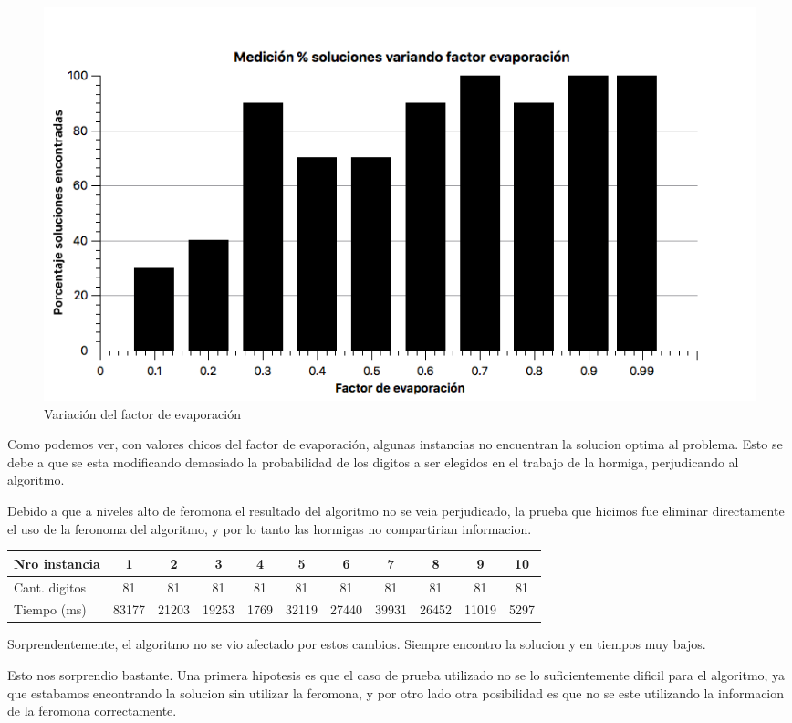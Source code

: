 \begin{figure}[h]
	\centering
	\includegraphics[scale=0.4]{./graficos/variacion_evaporacion.png}
	\caption{Variación del factor de evaporación}
\end{figure}

\newpage

Como podemos ver, con valores chicos del factor de evaporación, algunas instancias no 
encuentran la solucion optima al problema. Esto se debe a que se esta 
modificando demasiado la probabilidad de los digitos a ser elegidos en el trabajo de la hormiga, perjudicando al 
algoritmo. 

Debido a que a niveles alto de feromona el resultado del algoritmo no se veia perjudicado, 
la prueba que hicimos fue eliminar directamente el uso de 
la feronoma del algoritmo, y por lo tanto las hormigas no compartirian 
informacion. 

\begin{center}
  \begin{tabular}{ | l | c | c | c | c | c | c | c | c| c | c |}
    \hline
    Nro instancia &  1 & 2 & 3 & 4 & 5 & 6 & 7 & 8 & 9 & 10 \\  \hline
    Cant. digitos & 81 & 81 & 81 & 81 & 81 & 81 & 81 & 81 & 81 & 81 \\ \hline
    Tiempo (ms) & 83177 & 21203 & 19253 & 1769 & 32119 & 27440 & 39931 & 26452 & 11019 & 5297 \\
    \hline
  \end{tabular}
\end{center}

Sorprendentemente, el algoritmo no se vio afectado por estos cambios. Siempre 
encontro la solucion y en tiempos muy bajos.

Esto nos sorprendio bastante. Una primera hipotesis es que el caso de prueba utilizado no se lo 
suficientemente dificil para el algoritmo, ya que estabamos encontrando la 
solucion sin utilizar la feromona, y por otro lado otra posibilidad es que no se 
este utilizando la informacion de la feromona correctamente.

